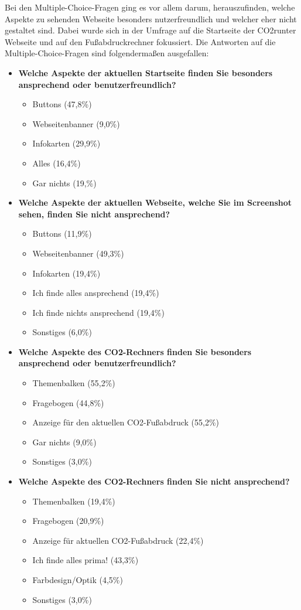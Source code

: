 Bei den Multiple-Choice-Fragen ging es vor allem darum, herauszufinden, welche Aspekte zu sehenden Webseite besonders nutzerfreundlich und welcher eher nicht gestaltet sind.
Dabei wurde sich in der Umfrage auf die Startseite der CO2runter Webseite und auf den Fußabdruckrechner fokussiert.
Die Antworten auf die Multiple-Choice-Fragen sind folgendermaßen ausgefallen:
\begin{itemize}
    \item \textbf{Welche Aspekte der aktuellen Startseite finden Sie besonders ansprechend oder benutzerfreundlich?}
    \begin{itemize}
        \item Buttons (47,8\%)
        \item Webseitenbanner (9,0\%)
        \item Infokarten (29,9\%)
        \item Alles (16,4\%)
        \item Gar nichts (19,\%)
    \end{itemize}
    \item \textbf{Welche Aspekte der aktuellen Webseite, welche Sie im Screenshot sehen, finden Sie nicht ansprechend?}
    \begin{itemize}
        \item Buttons (11,9\%)
        \item Webseitenbanner (49,3\%)
        \item Infokarten (19,4\%)
        \item Ich finde alles ansprechend (19,4\%)
        \item Ich finde nichts ansprechend (19,4\%)
        \item Sonstiges (6,0\%)
    \end{itemize}
    \item \textbf{Welche Aspekte des CO2-Rechners finden Sie besonders ansprechend oder benutzerfreundlich?}
    \begin{itemize}
        \item Themenbalken (55,2\%)
        \item Fragebogen (44,8\%)
        \item Anzeige für den aktuellen CO2-Fußabdruck (55,2\%)
        \item Gar nichts (9,0\%)
        \item Sonstiges (3,0\%)
    \end{itemize}
    \item \textbf{Welche Aspekte des CO2-Rechners finden Sie nicht ansprechend?}
    \begin{itemize}
        \item Themenbalken (19,4\%)
        \item Fragebogen (20,9\%)
        \item Anzeige für aktuellen CO2-Fußabdruck (22,4\%)
        \item Ich finde alles prima! (43,3\%)
        \item Farbdesign/Optik (4,5\%)
        \item Sonstiges (3,0\%)
    \end{itemize}
\end{itemize}
